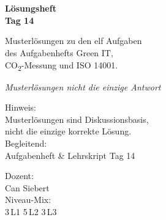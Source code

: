 \documentclass[11pt,a4paper,oneside]{article}
\newcommand{\caveatfontfallback}{\itshape}
\newcommand\caveatfont{\caveatfontfallback}%
\begin{document}
\begin{titlepage}
  \pagestyle{empty}
  \vspace*{1.5cm}
  \\[2pt]
  \noindent{\color{lpAccent}\rule{\linewidth}{1.2pt}}\\[4pt]

  \vspace{3cm}
  {\sffamily\fontsize{30}{34}\selectfont\bfseries\color{lpInk}L\"osungsheft\\Tag 14\par}

  \vspace{0.7cm}
  {\sffamily\large\color{lpGray}Musterl\"osungen zu den elf Aufgaben\\des Aufgabenhefts \textendash{} Green IT,\\CO\textsubscript{2}-Messung und ISO 14001.\par}

  \vspace{1.5cm}
  {\caveatfont\LARGE\color{lpGreen}Musterl\"osungen \textperiodcentered{} nicht die einzige Antwort}\par

  \vfill

  \noindent\begin{minipage}{0.55\linewidth}
    {\sffamily\footnotesize\color{lpGray}Hinweis:}\\
    {\sffamily\small\color{lpInk}Musterl\"osungen sind Diskussionsbasis,\\nicht die einzige korrekte L\"osung.}\\[10pt]
    {\sffamily\footnotesize\color{lpGray}Begleitend:}\\
    {\sffamily\small\color{lpInk}Aufgabenheft \& Lehrskript Tag 14}
  \end{minipage}\hfill
  \begin{minipage}{0.4\linewidth}
    \raggedleft
    {\sffamily\footnotesize\color{lpGray}Dozent:}\\
    {\sffamily\small\color{lpInk}Can Siebert}\\[10pt]
    {\sffamily\footnotesize\color{lpGray}Niveau-Mix:}\\
    {\sffamily\small\color{lpInk}3\,L1 \textperiodcentered{} 5\,L2 \textperiodcentered{} 3\,L3}
  \end{minipage}

  \vspace{0.5cm}
  \noindent{\color{lpAccent}\rule{\linewidth}{0.6pt}}
\end{titlepage}
\end{document}
